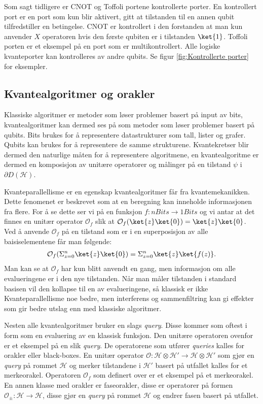         Som sagt tidligere er CNOT og Toffoli portene kontrollerte porter. En kontrollert port er en port som kun blir aktivert, gitt at tilstanden til en annen qubit tilfredstiller en betingelse. CNOT er kontrollert i den forstanden at man kun anvender $X$ operatoren hvis den første qubiten er i tilstanden $\ket{1}$. Toffoli porten er et eksempel på en port som er multikontrollert. Alle logiske kvanteporter kan kontrolleres av andre qubits. Se figur \ref{fig:Kontrollerte porter} for eksempler.

\subsection{Kvantealgoritmer og orakler}

        Klassiske algoritmer er metoder som løser problemer basert på input av bits, kvantealgoritmer kan dermed ses på som metoder som løser problemer basert på qubits. Bits brukes for å representere datastrukturer som tall, lister og grafer. Qubits kan brukes for å representere de samme strukturene. Kvantekretser blir dermed den naturlige måten for å representere algoritmene, en kvantealgoritme er dermed en komposisjon av unitære operatorer og målinger på en tilstand $\psi$ i $\partial D(\mathcal{H})$. 
        
        Kvanteparallellisme er en egenskap kvantealgoritmer får fra kvantemekanikken. Dette fenomenet er beskrevet som at en beregning kan inneholde informasjonen fra flere. For å se dette ser vi på en funksjon $f:nBits\rightarrow 1Bits$ og vi antar at det finnes en unitær operator $\mathcal{O}_f$ slik at $\mathcal{O}_f(\ket{z}\ket{0})=\ket{z}\ket{0}$. Ved å anvende $\mathcal{O}_f$ på en tilstand som er i en superposisjon av alle baisiselementene får man følgende:
        \begin{align*}
            \mathcal{O}_f(\Sigma_{z=0}^n\ket{z}\ket{0}) = \Sigma_{z=0}^n\ket{z}\ket{f(z)}.
        \end{align*}
        Man kan se at $\mathcal{O}_f$ har kun blitt anvendt en gang, men informasjon om alle evalueringene er i den nye tilstanden. Når man måler tilstanden i standard basisen vil den kollapse til en av evalueringene, så klassisk er ikke Kvanteparallellisme noe bedre, men interferens og sammenfiltring kan gi effekter som gir bedre utslag enn med klassiske algoritmer.

        Nesten alle kvantealgoritmer bruker en slags \emph{query}. Disse kommer som oftest i form som en evaluering av en klassisk funksjon. Den unitære operatoren ovenfor er et eksempel på en slik \emph{query}. De operatorene som utfører \emph{queries} kalles for orakler eller black-boxes. En unitær operator $\mathcal{O}:\mathcal{H}\otimes\mathcal{H}'\rightarrow\mathcal{H}\otimes\mathcal{H}'$ som gjør en \emph{query} på rommet $\mathcal{H}$ og merker tilstandene i $\mathcal{H}'$ basert på utfallet kalles for et merkeorakel. Operatoren $\mathcal{O}_f$ som definert over er et eksempel på et merkeorakel. En annen klasse med orakler er faseorakler, disse er operatorer på formen $\mathcal{O}_\pm:\mathcal{H}\rightarrow\mathcal{H}$, disse gjør en \emph{query} på rommet $\mathcal{H}$ og endrer fasen basert på utfallet.

